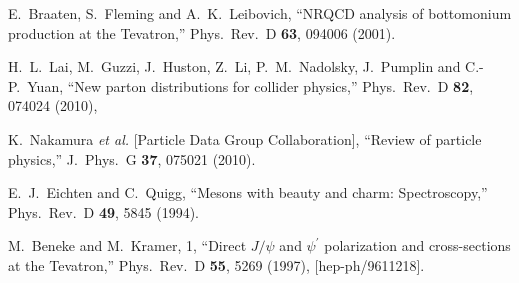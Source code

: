 \documentclass[aps,prc,preprint,superscriptaddress,showpacs,showkeys,amsmath]{revtex4-1}
\begin{document}
\begin{thebibliography}{100}
  E.~Braaten, S.~Fleming and A.~K.~Leibovich,
  ``NRQCD analysis of bottomonium production at the Tevatron,''
  Phys.\ Rev.\ D {\bf 63}, 094006 (2001).


  H.~L.~Lai, M.~Guzzi, J.~Huston, Z.~Li, P.~M.~Nadolsky, J.~Pumplin and C.-P.~Yuan,
  ``New parton distributions for collider physics,''
  Phys.\ Rev.\ D {\bf 82}, 074024 (2010),


  K.~Nakamura {\it et al.}  [Particle Data Group Collaboration],
  ``Review of particle physics,''
  J.\ Phys.\ G {\bf 37}, 075021 (2010).


  E.~J.~Eichten and C.~Quigg,
  ``Mesons with beauty and charm: Spectroscopy,''
  Phys.\ Rev.\ D {\bf 49}, 5845 (1994).

  M.~Beneke and M.~Kramer, 1,
  ``Direct $J/\psi$ and $\psi^\prime$ polarization and cross-sections at the Tevatron,''
  Phys.\ Rev.\ D {\bf 55}, 5269 (1997), [hep-ph/9611218].

















 
 


\end{thebibliography}
\end{document}
